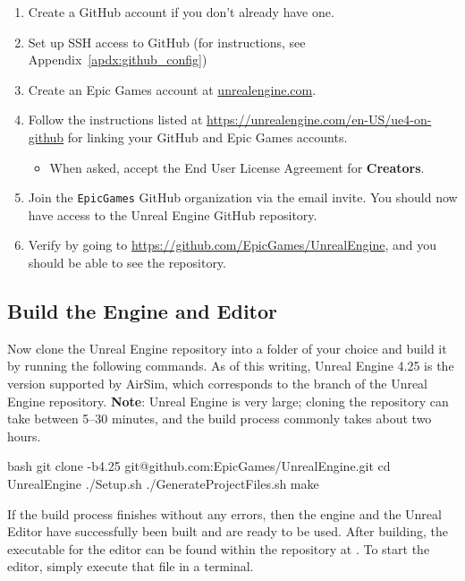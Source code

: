 \begin{enumerate}
    \item Create a GitHub account if you don't already have one.
    \item Set up SSH access to GitHub (for instructions, see Appendix~\ref{apdx:github_config})
    \item Create an Epic Games account at \url{unrealengine.com}.
    \item Follow the instructions listed at \url{https://unrealengine.com/en-US/ue4-on-github} for linking your GitHub and Epic Games accounts.
    \begin{itemize}
        \item When asked, accept the End User License Agreement for \textbf{Creators}.
    \end{itemize}
    \item Join the \verb|EpicGames| GitHub organization via the email invite. You should now have access to the Unreal Engine GitHub repository.
    \item Verify by going to \url{https://github.com/EpicGames/UnrealEngine}, and you should be able to see the repository.
\end{enumerate}

\subsection{Build the Engine and Editor}
Now clone the Unreal Engine repository into a folder of your choice and build it by running the following commands. As of this writing, Unreal Engine 4.25 is the version supported by AirSim, which corresponds to the  branch of the Unreal Engine repository. \textbf{Note}: Unreal Engine is very large; cloning the repository can take between 5--30 minutes, and the build process commonly takes about two hours.
\begin{minttcb}[title={Clone and Build Unreal Engine}]{bash}
    git clone -b4.25 git@github.com:EpicGames/UnrealEngine.git
    cd UnrealEngine
    ./Setup.sh
    ./GenerateProjectFiles.sh
    make
\end{minttcb}
If the build process finishes without any errors, then the engine and the Unreal Editor have successfully been built and are ready to be used. After building, the executable for the editor can be found within the repository at . To start the editor, simply execute that file in a terminal.


